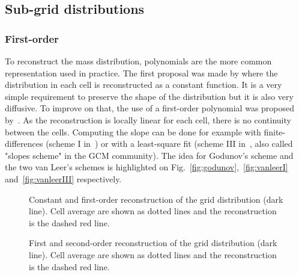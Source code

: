 \subsection{Sub-grid distributions}
\subsubsection{First-order}
To reconstruct the mass distribution, polynomials are the more common
representation used in practice. The first proposal was made by
\cite{Godunov1961} where the distribution in each cell is reconstructed as a
constant function. It is a very simple requirement to preserve the
shape of the distribution but it is also very diffusive. To improve on that, the use
of a first-order polynomial was proposed by~\cite{Leer1977}. As the
reconstruction is locally linear for each cell, there is no continuity between
the cells.  Computing the slope can be done for example with
finite-differences (scheme I in~\cite{Leer1977}) or with a least-square fit
(scheme III in~\cite{Leer1977}, also called "slopes scheme" in the \gls{GCM}
community). The idea for Godunov's scheme and the two van Leer's schemes is
highlighted on Fig.~\ref{fig:godunov},~\ref{fig:vanleerI}
and~\ref{fig:vanleerIII} respectively.
\begin{figure}
  \hfill
  \caption{Constant and first-order reconstruction of the grid distribution
    (dark line). Cell average are shown as dotted lines and the reconstruction is
  the dashed red line.}
\end{figure}

\begin{figure}
  \hfill
  \caption{First and second-order reconstruction of the grid distribution (dark
    line). Cell average are shown as dotted lines and the reconstruction is the
  dashed red line.}
\end{figure}

